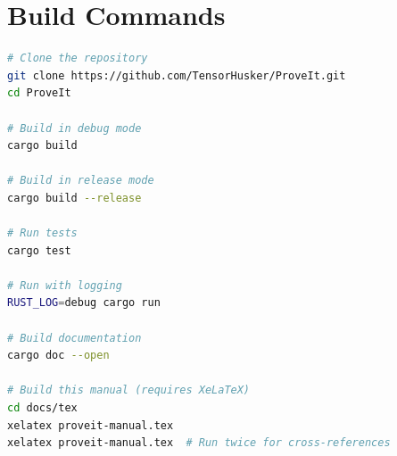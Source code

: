 \documentclass[11pt,a4paper,twoside]{report}
\begin{document}
\section{Build Commands}

\begin{lstlisting}[language=bash, caption={Build commands}]
# Clone the repository
git clone https://github.com/TensorHusker/ProveIt.git
cd ProveIt

# Build in debug mode
cargo build

# Build in release mode
cargo build --release

# Run tests
cargo test

# Run with logging
RUST_LOG=debug cargo run

# Build documentation
cargo doc --open

# Build this manual (requires XeLaTeX)
cd docs/tex
xelatex proveit-manual.tex
xelatex proveit-manual.tex  # Run twice for cross-references
\end{lstlisting}

\printindex
\end{document}
